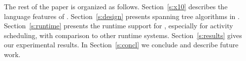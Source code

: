  The rest of the paper is organized as follows. Section~\ref{s:x10} describes the language features of \Xten{}. Section~\ref{s:design} presents spanning tree algorithms in \Xten{}. Section~\ref{s:runtime} presents the runtime support for \Xten{}, especially for activity scheduling, with comparison to other runtime systems. 
 Section~\ref{s:results} gives our experimental results. In Section~\ref{s:concl} we conclude and describe future work. 
  


